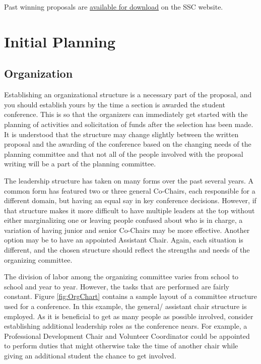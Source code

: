 \documentclass[12pt]{article}
\begin{document}
Past winning proposals are \href{http://students.ans.org/student-conferences/}{available for download} on the SSC website.

\clearpage

\section{Initial Planning}

\subsection{Organization}
Establishing an organizational structure is a necessary part of the proposal, and you should establish yours by the time a section is awarded the student conference.
This is so that the organizers can immediately get started with the planning of activities and solicitation of funds after the selection has been made.
It is understood that the structure may change slightly between the written proposal and the awarding of the conference based on the changing needs of the planning committee and that not all of the people involved with the proposal writing will be a part of the planning committee.

The leadership structure has taken on many forms over the past several years.
A common form has featured two or three general Co-Chairs, each responsible for a different domain, but having an equal say in key conference decisions.
However, if that structure makes it more difficult to have multiple leaders at the top without either marginalizing one or leaving people confused about who is in charge, a variation of having junior and senior Co-Chairs may be more effective.
Another option may be to have an appointed Assistant Chair.
Again, each situation is different, and the chosen structure should reflect the strengths and needs of the organizing committee.

The division of labor among the organizing committee varies from school to school and year to year.
However, the tasks that are performed are fairly constant.
Figure \ref{fig:OrgChart} contains a sample layout of a committee structure used for a conference.
In this example, the general/ assistant chair structure is employed.
As it is beneficial to get as many people as possible involved, consider establishing additional leadership roles as the conference nears.
For example, a Professional Development Chair and Volunteer Coordinator could be appointed to perform duties that might otherwise take the time of another chair while giving an additional student the chance to get involved.
\end{document}
